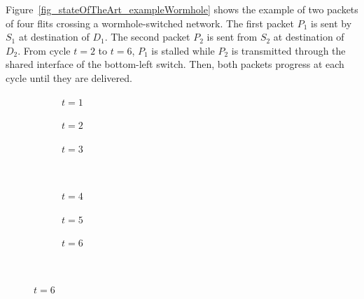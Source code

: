 \documentclass[main.tex]{subfiles}
\begin{document}
\begin{example}
Figure~\ref{fig_stateOfTheArt_exampleWormhole} shows the example of two packets of four flits crossing a wormhole-switched network. The first packet $P_1$ is sent by $S_1$ at destination of $D_1$. The second packet $P_2$ is sent from $S_2$ at destination of $D_2$. From cycle $t = 2$ to $t=6$, $P_1$ is stalled while $P_2$ is transmitted through the shared interface of the bottom-left switch. Then, both packets progress at each cycle until they are delivered. 



\begin{figure}
    \captionsetup[subfigure]{labelformat=empty}
    \centering
    
    \begin{subfigure}[b]{0.3\linewidth}
    \centering
        \scalebox{0.25}{}
        \caption{$t=1$}
    \end{subfigure}
     \hspace{5mm}
    \begin{subfigure}[b]{0.3\linewidth}
    \centering
        \scalebox{0.25}{}
        \caption{$t=2$}
    \end{subfigure}
     \hspace{5mm}
    \begin{subfigure}[b]{0.3\linewidth}
    \centering
        \scalebox{0.25}{}
        \caption{$t=3$}
    \end{subfigure}\\

    \vspace{10mm}

    \begin{subfigure}[b]{0.3\linewidth}
    \centering
        \scalebox{0.25}{}
        \caption{$t=4$}
    \end{subfigure}
     \hspace{5mm}
    \begin{subfigure}[b]{0.3\linewidth}
    \centering
        \scalebox{0.25}{}
        \caption{$t=5$}
    \end{subfigure}
     \hspace{5mm}
    \begin{subfigure}[b]{0.3\linewidth}
    \centering
        \scalebox{0.25}{}
        \caption{$t=6$}
    \end{subfigure} \\


\end{figure}
\end{example}
\end{document}
